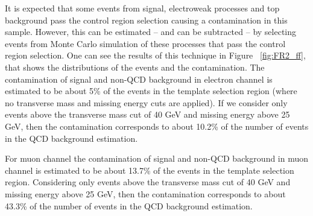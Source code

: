 It is expected that some events from signal, electroweak processes and top background pass the control region selection causing a contamination in this sample. 
However, this can be estimated – and can be subtracted – by selecting events from Monte Carlo simulation of these processes that pass the control region selection. 
One can see the results of this technique in Figure~ \ref{fig:FR2_ff}, that shows the distributions of the events and the contamination. 
The contamination of signal and non-QCD background in electron channel is estimated to be about 5\% of the events in the template selection region (where no transverse mass and missing energy cuts are applied).
If we consider only events above the transverse mass cut of 40 GeV and missing energy above 25 GeV, then the contamination corresponds to about 10.2\% of the number of events in the QCD background estimation.

For muon channel the contamination of signal and non-QCD background in muon channel is estimated to be about 13.7\% of the events in the template selection region.
Considering only events above the transverse mass cut of 40 GeV and missing energy above 25 GeV, then the contamination corresponds to about 43.3\% of the number of events in the QCD background estimation.

